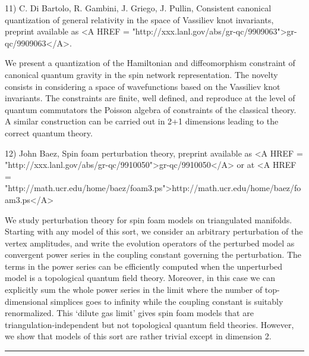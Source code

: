 11) C. Di Bartolo, R. Gambini, J. Griego, J. Pullin, Consistent
canonical quantization of general relativity in the space of
Vassiliev knot invariants, preprint available as <A HREF = "http://xxx.lanl.gov/abs/gr-qc/9909063">gr-qc/9909063</A>.  

We present a quantization of the Hamiltonian and diffeomorphism
constraint of canonical quantum gravity in the spin network
representation.  The novelty consists in considering a space of
wavefunctions based on the Vassiliev knot invariants.  The constraints
are finite, well defined, and reproduce at the level of quantum
commutators the Poisson algebra of constraints of the classical theory.
A similar construction can be carried out in 2+1 dimensions leading to
the correct quantum theory.

12) John Baez, Spin foam perturbation theory, preprint available as 
<A HREF = "http://xxx.lanl.gov/abs/gr-qc/9910050">gr-qc/9910050</A> or at 
<A HREF = "http://math.ucr.edu/home/baez/foam3.ps">http://math.ucr.edu/home/baez/foam3.ps</A>

We study perturbation theory for spin foam models on triangulated
manifolds.  Starting with any model of this sort, we consider an
arbitrary perturbation of the vertex amplitudes, and write the 
evolution operators of the perturbed model as convergent power series in
the coupling constant governing the perturbation.   The terms in the
power series can be efficiently computed when the unperturbed model is a
topological quantum field theory.  Moreover, in this case we can
explicitly sum the whole power series in the limit where the number  of
top-dimensional simplices goes to infinity while the coupling constant
is suitably renormalized.  This `dilute gas limit' gives spin foam
models that are triangulation-independent but not topological quantum
field theories.  However, we show that models of this sort are rather
trivial except in dimension 2.
 






 \par\noindent\rule{\textwidth}{0.4pt}

